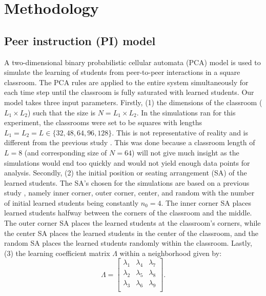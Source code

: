 \documentclass[10pt,a4paper,twoside]{article}
\begin{document}
\section{Methodology}\label{sec:methods}
\subsection{Peer instruction (PI) model }
A two-dimensional binary probabilistic cellular automata (PCA) model is used to simulate the learning of students from peer-to-peer interactions in a square classroom. The PCA rules are applied to the entire system simultaneously for each time step until the classroom is fully saturated with learned students. Our model takes three input parameters. Firstly, (1) the dimensions of the classroom ($L_1 \times L_2$) such that the size is $N=L_1 \times L_2$. In the simulations ran for this experiment, the classrooms were set to be squares with lengths $L_1 = L_2 = L \in \lbrace 32,48,64,96,128\rbrace$. This is not representative of reality and is different from the previous study \cite{roxas2010seating}. This was done because a classroom length of $L=8$ (and corresponding size of $N=64$) will not give much insight as the simulations would end too quickly and would not yield enough data points for analysis. Secondly, (2) the initial position or seating arrangement (SA) of the learned students. The SA's chosen for the simulations are based on a previous study \cite{roxas2010seating}, namely inner corner, outer corner, center, and random with the number of initial learned students being constantly $n_0 = 4$. The inner corner SA places learned students halfway between the corners of the classroom and the middle. The outer corner SA places the learned students at the classroom's corners, while the center SA places the learned students in the center of the classroom, and the random SA places the learned students randomly within the classroom. Lastly, (3) the learning coefficient matrix $\Lambda$ within a neighborhood given by:
\begin{equation}\label{eq:Lambda matrix}
  \Lambda = 
  \begin{bmatrix}
  \lambda_1 & \lambda_4 & \lambda_7\\
  \lambda_2 & \lambda_5 & \lambda_8\\
  \lambda_3 & \lambda_6 & \lambda_9\\
  \end{bmatrix} \text{.}%
\end{equation}
\end{document}
